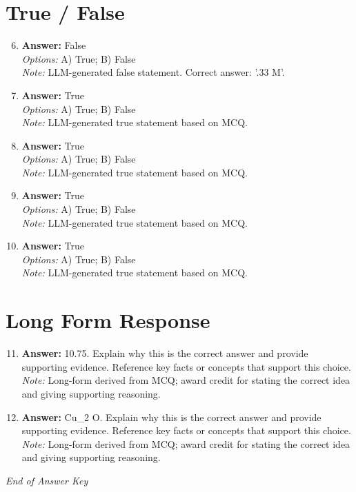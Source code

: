 \documentclass[12pt]{article}
\begin{document}
\section*{True / False}
\begin{enumerate}[label=\arabic*.]
\setcounter{enumi}{5}
\item \textbf{Answer:} False
\\ \textit{Options:} A) True; B) False
\\ \textit{Note:} LLM-generated false statement. Correct answer: '.33 M'.
\item \textbf{Answer:} True
\\ \textit{Options:} A) True; B) False
\\ \textit{Note:} LLM-generated true statement based on MCQ.
\item \textbf{Answer:} True
\\ \textit{Options:} A) True; B) False
\\ \textit{Note:} LLM-generated true statement based on MCQ.
\item \textbf{Answer:} True
\\ \textit{Options:} A) True; B) False
\\ \textit{Note:} LLM-generated true statement based on MCQ.
\item \textbf{Answer:} True
\\ \textit{Options:} A) True; B) False
\\ \textit{Note:} LLM-generated true statement based on MCQ.
\end{enumerate}

\section*{Long Form Response}
\begin{enumerate}[label=\arabic*.]
\setcounter{enumi}{10}
\item \textbf{Answer:} 10.75. Explain why this is the correct answer and provide supporting evidence. Reference key facts or concepts that support this choice.
\\ \textit{Note:} Long-form derived from MCQ; award credit for stating the correct idea and giving supporting reasoning.
\item \textbf{Answer:} Cu\_2 O. Explain why this is the correct answer and provide supporting evidence. Reference key facts or concepts that support this choice.
\\ \textit{Note:} Long-form derived from MCQ; award credit for stating the correct idea and giving supporting reasoning.
\end{enumerate}

\vfill
\noindent\textit{End of Answer Key}
\end{document}
